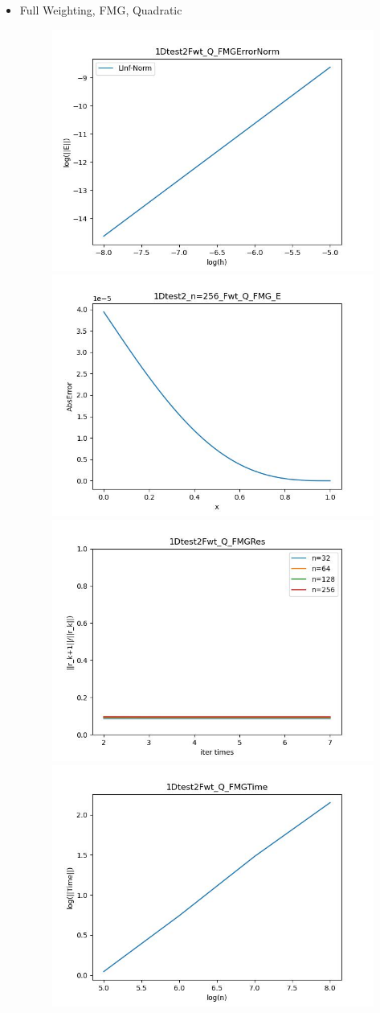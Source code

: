 \documentclass{article}
\begin{document}
\begin{itemize}
    \item Full Weighting, FMG, Quadratic
    \begin{figure}[h]
        \centering
        \includegraphics[width=0.35\linewidth]{1Dtest2Fwt_Q_FMGErrorNorm.jpg}
        \includegraphics[width=0.35\linewidth]{1Dtest2_n=256_Fwt_Q_FMG_E.jpg}
        \includegraphics[width=0.35\linewidth]{1Dtest2Fwt_Q_FMGRes.jpg}
        \includegraphics[width=0.35\linewidth]{1Dtest2Fwt_Q_FMGTime.jpg}
    \end{figure}
    

\end{itemize}
\end{document}

